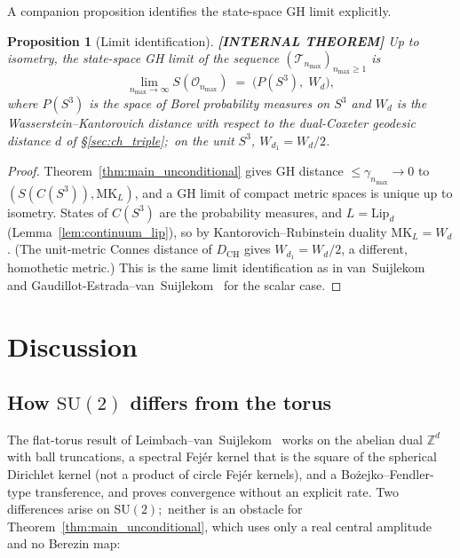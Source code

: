\documentclass[11pt,a4paper]{article}
\theoremstyle{plain}
\newtheorem{proposition}[theorem]{Proposition}
\theoremstyle{definition}
\newcommand{\nmax}{n_{\max}}
\newcommand{\sthree}{S^{3}}
\newcommand{\Op}{\mathcal{O}}
\newcommand{\Tcal}{\mathcal{T}}
\newcommand{\Z}{\mathbb{Z}}
\newcommand{\SU}{\mathrm{SU}}
\newcommand{\DCH}{D_{\mathrm{CH}}}
\begin{document}
A companion proposition identifies the state-space GH limit explicitly.

\begin{proposition}[Limit identification]
\label{prop:limit_identification}
\textbf{[INTERNAL THEOREM]} Up to isometry, the state-space GH limit
of the sequence $(\Tcal_{\nmax})_{\nmax \ge 1}$ is
\begin{equation*}
   \lim_{\nmax \to \infty} S(\Op_{\nmax})
   \;=\; \bigl(P(\sthree),\; W_d\bigr),
\end{equation*}
where $P(\sthree)$ is the space of Borel probability measures on
$\sthree$ and $W_d$ is the Wasserstein--Kantorovich distance with
respect to the dual-Coxeter geodesic distance $d$ of
\S\ref{sec:ch_triple};\ on the unit $\sthree$, $W_{d_1} = W_d/2$.
\end{proposition}

\begin{proof}
Theorem~\ref{thm:main_unconditional} gives GH distance $\le
\gamma_{\nmax} \to 0$ to $(S(C(\sthree)), \mathrm{MK}_L)$, and a GH
limit of compact metric spaces is unique up to isometry. States of
$C(\sthree)$ are the probability measures, and $L = \mathrm{Lip}_d$
(Lemma~\ref{lem:continuum_lip}), so by Kantorovich--Rubinstein duality
$\mathrm{MK}_L = W_d$. (The unit-metric Connes distance of $\DCH$ gives
$W_{d_1} = W_d/2$, a different, homothetic metric.) This is the same limit identification as in
van~Suijlekom~\cite{vs2021_jgp} and
Gaudillot-Estrada--van~Suijlekom~\cite{gaudillot_vs2025} for the
scalar case.
\end{proof}

\section{Discussion}\label{sec:discussion}

\subsection{How $\SU(2)$ differs from the torus}\label{sec:why_su2}

The flat-torus result of Leimbach--van~Suijlekom~\cite{leimbach_vs2024}
works on the abelian dual $\Z^d$ with ball truncations, a spectral
Fej\'er kernel that is the square of the spherical Dirichlet kernel
(not a product of circle Fej\'er kernels), and a
Bo\.zejko--Fendler-type transference, and proves convergence without an
explicit rate.
Two differences arise on $\SU(2)$;\ neither is an obstacle for
Theorem~\ref{thm:main_unconditional}, which uses only a real central
amplitude and no Berezin map:
\end{document}
